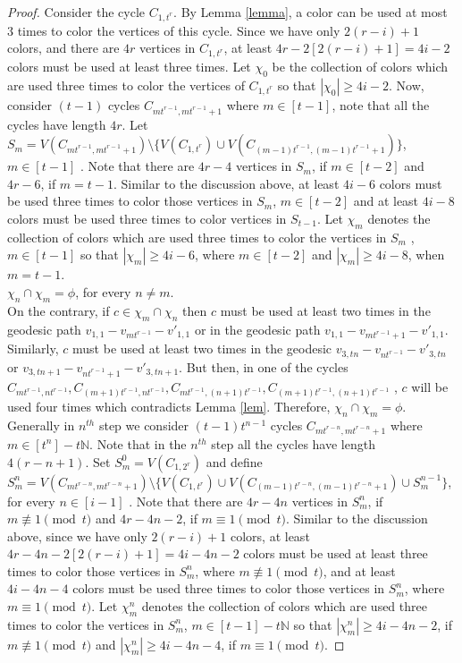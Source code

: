 \documentclass[12pt]{article}
\def\ni{\noindent}
\begin{document}
\begin{proof}
	Consider the cycle $C_{1,t^r}$. By Lemma \ref{lemma}, a color can be used at most 3 times to color the vertices of this cycle. Since we have only $2(r-i)+1$ colors, and there are $4r$ vertices in $C_{1,t^r}$, at least $4r - 2[2(r-i)+1] = 4i-2$ colors must be used at least three times. Let $\chi_0$ be the collection of colors which are used three times to color the vertices of $C_{1,t^r}$ so that $|\chi_0|\geq4i-2$. Now, consider $(t-1)$ cycles $C_{mt^{r-1},mt^{r-1}+1}$ where $m \in [t-1]$, note that all the cycles have length $4r$. Let $S_m=V(C_{mt^{r-1},mt^{r-1}+1})\setminus \{V(C_{1,t^r}) \cup V(C_{(m-1)t^{r-1},(m-1)t^{r-1}+1} )\}$, $m \in [t-1]$ . Note that there are $4r-4$ vertices in $S_m$, if $m \in [t-2]$ and $4r-6$, if $m=t-1$. Similar to the discussion above, at least $4i - 6$ colors must be used three times to color those vertices in $S_m$, $m\in [t-2]$ and at least $4i-8$ colors must be used three times to color vertices in $S_{t-1}$. Let $\chi_m$ denotes the collection of colors which are used three times to color the vertices in $S_m$ , $ m \in [t-1]$ so that $|\chi_m|\geq4i - 6$, where $m \in [t-2]$ and $|\chi_m|\geq4i - 8$, when $m =t-1$. \\
\ni{\textbf{Claim 1:}} $\chi_n \cap \chi_m = \phi$, for every $n \neq m$.\\
On the contrary, if $c \in \chi_m \cap \chi_n$ then $c$ must be used at least two times in the geodesic path $v_{1,1} - v_{mt^{r-1}}-v'_{1,1}$ or in the geodesic path $v_{1,1}-v_{mt^{r-1}+1}-v'_{1,1}$. Similarly, $c$ must be used at least two times in the geodesic $v_{3,tn}-v_{nt^{r-1}}-v'_{3,tn}$ or $v_{3,tn+1}-v_{nt^{r-1}+1}-v'_{3,tn+1}$. But then, in one of the cycles $C_{mt^{r-1},nt^{r-1}}, C_{(m+1)t^{r-1},nt^{r-1}}, C_{mt^{r-1},(n+1)t^{r-1}}, C_{(m+1)t^{r-1},(n+1)t^{r-1}} $ , $c$ will be used four times which contradicts Lemma \ref{lem}. Therefore, $\chi_n \cap \chi_m= \phi$.\\
Generally in $n^ {th} $ step we consider $(t-1)t^{n-1}$ cycles $C_{mt^{r-n},mt^{r-n}+1}$ where $m \in [t^n] - t\mathbb{N}$. Note that in the $n^{th}$ step all the cycles have length $4(r-n+1)$. Set $S^0_m=V(C_{1,2^r})$ and define  $S_m^{n}=V(C_{mt^{r-n},mt^{r-n}+1}) \setminus  \{V( C_{1,t^r}) \cup V( C_{(m-1)t^{r-n},(m-1)t^{r-n}+1})  \cup S_m ^{n-1} \}$, for every $n \in [i-1]$ . Note that there are $4r-4n$ vertices in $S^n_m$,  if $ m \not \equiv  1\pmod t$ and $4r-4n-2$, if $ m \equiv 1 \pmod t$. Similar to the discussion above, since we have only $2(r-i)+1$ colors, at least $4r-4n - 2[2(r-i)+1] = 4i-4n-2$ colors must be used at least three times to color those vertices in  $S_m^n$, where $ m \not \equiv 1 \pmod t$, and at least $4i-4n-4$ colors must be used three times to color those vertices in $S_m^n$, where $ m \equiv 1 \pmod t$. Let $\chi^n_m$ denotes the collection of colors which are used three times to color the vertices in $S_m^n$, $ m \in [t-1] - t\mathbb{N}$ so that $|\chi^n_m|\geq 4i - 4n-2$, if $ m \not \equiv 1 \pmod t$ and $|\chi^n_m|\geq 4i - 4n-4$, if $ m \equiv 1 \pmod t$. \par

\end{proof}
\end{document}

